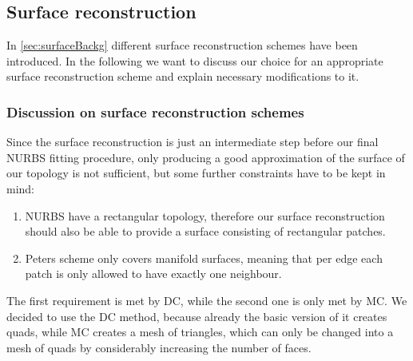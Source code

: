 \subsection{Surface reconstruction}
In \autoref{sec:surfaceBackg} different surface reconstruction schemes have been introduced. In the following we want to discuss our choice for an appropriate surface reconstruction scheme and explain necessary modifications to it.

\subsubsection{Discussion on surface reconstruction schemes}
Since the surface reconstruction is just an intermediate step before our final \ac{NURBS} fitting procedure, only producing a good approximation of the surface of our topology is not sufficient, but some further constraints have to be kept in mind:
\begin{enumerate}
\item \ac{NURBS} have a rectangular topology, therefore our surface reconstruction should also be able to provide a surface consisting of rectangular patches.
\item Peters scheme only covers manifold surfaces, meaning that per edge each patch is only allowed to have exactly one neighbour.
\end{enumerate}
The first requirement is met by \ac{DC}, while the second one is only met by \ac{MC}. We decided to use the \ac{DC} method, because already the basic version of it creates \acp{quad}, while \ac{MC} creates a mesh of triangles, which can only be changed into a mesh of \acp{quad} by considerably increasing the number of faces.

